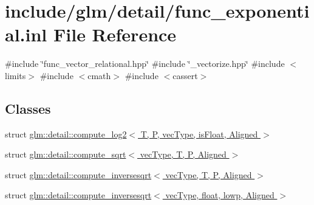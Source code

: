 \hypertarget{func__exponential_8inl}{}\section{include/glm/detail/func\+\_\+exponential.inl File Reference}
\label{func__exponential_8inl}
{\ttfamily \#include \char`\"{}func\+\_\+vector\+\_\+relational.\+hpp\char`\"{}}\newline
{\ttfamily \#include \char`\"{}\+\_\+vectorize.\+hpp\char`\"{}}\newline
{\ttfamily \#include $<$limits$>$}\newline
{\ttfamily \#include $<$cmath$>$}\newline
{\ttfamily \#include $<$cassert$>$}\newline
\subsection*{Classes}
\begin{DoxyCompactItemize}
\item 
struct \hyperlink{structglm_1_1detail_1_1compute__log2}{glm\+::detail\+::compute\+\_\+log2$<$ T, P, vec\+Type, is\+Float, Aligned $>$}
\item 
struct \hyperlink{structglm_1_1detail_1_1compute__sqrt}{glm\+::detail\+::compute\+\_\+sqrt$<$ vec\+Type, T, P, Aligned $>$}
\item 
struct \hyperlink{structglm_1_1detail_1_1compute__inversesqrt}{glm\+::detail\+::compute\+\_\+inversesqrt$<$ vec\+Type, T, P, Aligned $>$}
\item 
struct \hyperlink{structglm_1_1detail_1_1compute__inversesqrt_3_01vecType_00_01float_00_01lowp_00_01Aligned_01_4}{glm\+::detail\+::compute\+\_\+inversesqrt$<$ vec\+Type, float, lowp, Aligned $>$}
\end{DoxyCompactItemize}
